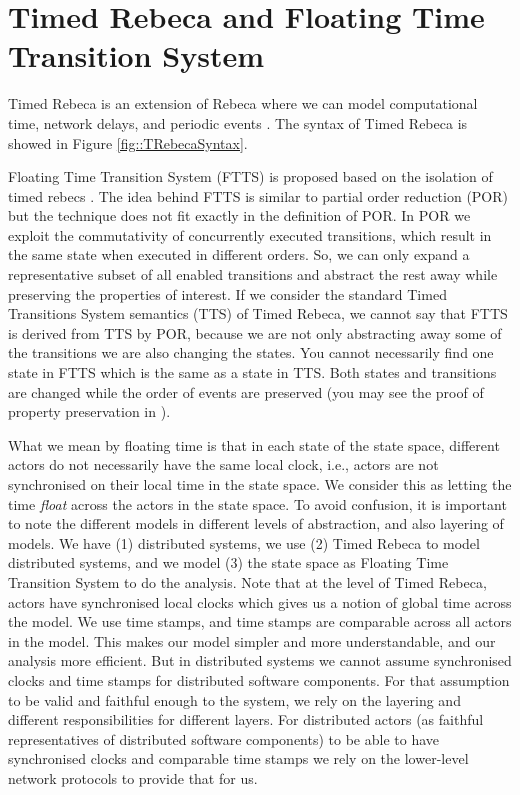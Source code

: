 \section{Timed Rebeca and Floating Time Transition System} \label{sec::FTTS}

Timed Rebeca is an extension of Rebeca where we can model computational time, network delays, and periodic events \cite{Arni}.
The syntax of Timed Rebeca is showed in Figure \ref{fig::TRebecaSyntax}.

Floating Time Transition System (FTTS) is proposed based on the isolation of timed rebecs \cite{FACS2015,SCP}. The idea behind FTTS is similar to partial order reduction (POR) but the technique does not fit exactly in the definition of POR. 
%
In POR we exploit the commutativity of concurrently executed transitions, which result in the same state when executed in different orders. So, we can only expand a representative subset of all enabled transitions and abstract the rest away while preserving the properties of interest. %
%
If we consider the standard Timed Transitions System semantics (TTS) of Timed Rebeca, we cannot say that FTTS is derived from TTS by POR, because we are not only abstracting away some of the transitions we are also changing the states. You cannot necessarily find one state in FTTS which is the same as a state in TTS. Both states and transitions are changed while the order of events are preserved (you may see the proof of property preservation in \cite{FTTSFACS}).
%

What we mean by floating time is that in each state of the state space, different actors do not necessarily have the same local clock, i.e.,  actors are not synchronised on their local time in the state space. We consider this as letting the time \textit{float} across the actors in the state space. 
To avoid confusion, it is important to note the different models in different levels of abstraction, and also layering of models. We have (1) distributed systems, we use (2) Timed Rebeca to model distributed systems, and we model (3) the state space as Floating Time Transition System to do the analysis. 
%
Note that at the level of Timed Rebeca, actors have synchronised local clocks which gives us a notion of global time across the model. We use time stamps, and time stamps are comparable across all actors in the model. This makes our model simpler and more understandable, and our analysis more efficient.
But in distributed systems we cannot assume synchronised clocks and time stamps for distributed software components. 
For that assumption to be valid and faithful enough to the system,  we rely on the layering and different responsibilities for different layers. For distributed actors (as faithful representatives of distributed software components) to be able to have synchronised clocks and comparable time stamps we rely on the lower-level network protocols to provide that for us. 

